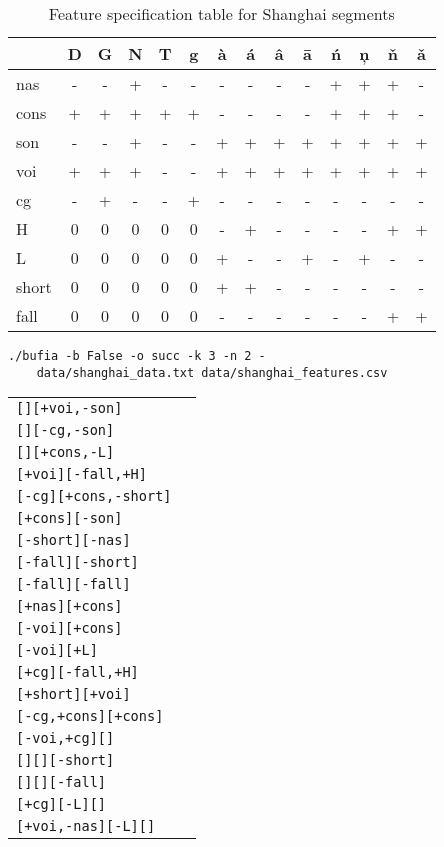 \documentclass{article}
\begin{document}
\begin{table}[h]
\centering
\begin{tabular}{lccccccccccccc}
\hline
     & D & G & N & T & g & \`{a} & \'{a} & \^{a} & \={a} & \'{n} & \c{n} & \v{n} & \v{a} \\
\hline
nas   & - & - & + & - & - & - & - & - & - & + & + & + & - \\
cons  & + & + & + & + & + & - & - & - & - & + & + & + & - \\
son   & - & - & + & - & - & + & + & + & + & + & + & + & + \\
voi   & + & + & + & - & - & + & + & + & + & + & + & + & + \\
cg    & - & + & - & - & + & - & - & - & - & - & - & - & - \\
H     & 0 & 0 & 0 & 0 & 0 & - & + & - & - & - & - & + & + \\
L     & 0 & 0 & 0 & 0 & 0 & + & - & - & + & - & + & - & - \\
short & 0 & 0 & 0 & 0 & 0 & + & + & - & - & - & - & - & - \\
fall  & 0 & 0 & 0 & 0 & 0 & - & - & - & - & - & - & + & + \\
\hline
\end{tabular}
\caption{Feature specification table for Shanghai segments}
\end{table}


\begin{verbatim}
./bufia -b False -o succ -k 3 -n 2 -
    data/shanghai_data.txt data/shanghai_features.csv
\end{verbatim}

\begin{tabular}{ll}
\texttt{[][+voi,-son]}       & \\
\texttt{[][-cg,-son]}        & \\
\texttt{[][+cons,-L]}        & \\
\texttt{[+voi][-fall,+H]}    & \\
\texttt{[-cg][+cons,-short]} & \\
\texttt{[+cons][-son]}       & \\
\texttt{[-short][-nas]}      & \\
\texttt{[-fall][-short]}     & \\
\texttt{[-fall][-fall]}      & \\
\texttt{[+nas][+cons]}       & \\
\texttt{[-voi][+cons]}       & \\
\texttt{[-voi][+L]}          & \\
\texttt{[+cg][-fall,+H]}     & \\
\texttt{[+short][+voi]}      & \\
\texttt{[-cg,+cons][+cons]}  & \\
\texttt{[-voi,+cg][]}        & \\
\texttt{[][][-short]}        & \\
\texttt{[][][-fall]}         & \\
\texttt{[+cg][-L][]}         & \\
\texttt{[+voi,-nas][-L][]}   & \\
\end{tabular}
\end{document}
